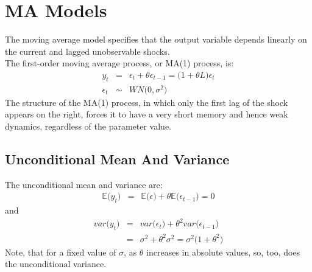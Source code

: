 \chapter{MA Models}
The moving average model specifies that the output variable depends linearly on the current and lagged unobservable shocks.\\
The first-order moving average process, or MA(1) process, is:
\begin{eqnarray}
	y_{t} &=& \epsilon_{t} + \theta\epsilon_{t - 1} = \big(1 + \theta L\big)\epsilon_{t}\\
	\epsilon_{t} &\sim& WN\Big(0, \sigma^{2}\Big)
\end{eqnarray}
The structure of the MA(1) process, in which only the first lag of the shock appears on the right, forces it to have a very short memory and hence weak dynamics, regardless of the parameter value.\\

\section{Unconditional Mean And Variance}
The unconditional mean and variance are:
\begin{eqnarray}
	\mathbb{E}\big(y_{t}\big) &=& \mathbb{E}\big(\epsilon\big) + \theta\mathbb{E}\big(\epsilon_{t - 1}\big) = 0
\end{eqnarray}
and
\begin{eqnarray}
	var\big(y_{t}\big) &=& var\big(\epsilon_{t}\big) + \theta^{2}var\big(\epsilon_{t - 1}\big)\\
	&=& \sigma^{2} +\theta^{2}\sigma^{2} = \sigma^{2}\big(1 + \theta^{2}\big)
\end{eqnarray}
Note, that for a fixed value of $\sigma$, as $\theta$ increases in absolute values, so, too, does the unconditional variance.

